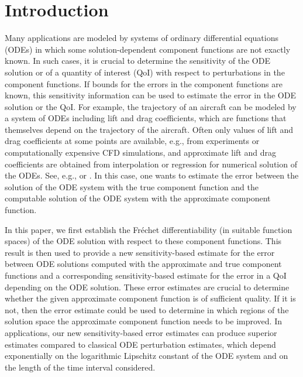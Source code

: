 \documentclass[onefignum,onetabnum]{siamart220329}
\numberwithin{equation}{section}
\begin{document}
\section{Introduction}   \label{sec:intro}
Many applications are modeled by systems of ordinary differential equations (ODEs)
in which some solution-dependent component functions are not exactly known.
In such cases, it is crucial to determine the sensitivity of the ODE solution or of a
quantity of interest (QoI) with respect to perturbations in the component functions. If bounds for the errors in the component functions are known, this sensitivity information can be used to estimate the error 
in the ODE solution or the QoI.
For example, the trajectory of an aircraft can be  modeled by a system
of ODEs including lift and drag coefficients, which are functions that themselves depend on the trajectory of the
aircraft. Often only values of lift and drag coefficients at some points are available, e.g., from experiments or
computationally expensive CFD simulations,  and approximate  lift and drag coefficients
are obtained from interpolation or regression for numerical solution of the ODEs.
See, e.g., \cite[Sec.~6.2]{JTBetts_2010a} or
\cite{JRCangelosi_MHeinkenschloss_JTNeedels_JJAlonso_2024a}.
In this case, one wants to estimate the error between the solution of the ODE system with the true component function
and the computable solution of the ODE system with the approximate component function.


In this paper, we first establish the Fr\'echet differentiability (in suitable function spaces) 
of the ODE solution with respect to these component functions.
This result is then used to provide a new sensitivity-based estimate for the error between ODE solutions computed with the 
approximate and true component functions
and a corresponding sensitivity-based estimate for the error in a QoI depending on the ODE solution.
These error estimates are crucial to determine whether the given approximate component function
is of sufficient quality. If it is not, then the error estimate could be used to determine in which regions of the solution 
space the approximate component function needs to be improved.
In applications, our new sensitivity-based error estimates can produce superior estimates compared to classical
ODE perturbation estimates, which depend exponentially on the logarithmic Lipschitz constant of the ODE system
and on the length of the time interval considered.
\end{document}
